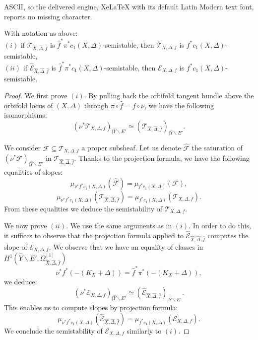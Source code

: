 \documentclass[10pt,a4paper]{amsart}
\begin{document}
ASCII, so the delivered engine, XeLaTeX with its default Latin Modern text font, reports no missing character.
\begin{lemm}\label{Reduction of semistability to the resolution}
    With notation as above:\\
    $(i)$ if $\mathcal{T}_{\widehat{X}, \widehat{\Delta}, \widehat{f}}$ is $\widehat{f}^*\pi^*c_1(X, \Delta)$-semistable, then $\mathcal{T}_{X, \Delta, f}$ is $f^*c_1(X, \Delta)$-semistable,\\
    $(ii)$ if $\widehat{\mathcal{E}}_{\widehat{X}, \widehat{\Delta}, \widehat{f}}$ is $\widehat{f}^*\pi^*c_1(X, \Delta)$-semistable, then $\mathcal{E}_{X, \Delta, f}$ is $f^*c_1(X, \Delta)$-semistable.
\end{lemm}

\begin{proof}

We first prove $(i)$. By pulling back the orbifold tangent bundle above the orbifold locus of $(X, \Delta)$ through $\pi \circ \widehat{f} = f \circ \nu $, we have the following isomorphisms:
$$
(\nu^{*}\mathcal{T}_{X, \Delta, f})_{|\widehat{Y} \backslash E'} \simeq (\mathcal{T}_{\widehat{X}, \widehat{\Delta}, \widehat{f}})_{|\widehat{Y} \backslash E'}.
$$

We consider $\mathcal{F} \subseteq \mathcal{T}_{X, \Delta, f}$ a proper subsheaf. Let us denote $\widehat{\mathcal{F}}$ the saturation of $(\nu^*\mathcal{F})_{|\widehat{Y} \backslash E'}$ in $\mathcal{T}_{\widehat{X}, \widehat{\Delta}, \widehat{f}}$. Thanks to the projection formula, we have the following equalities of slopes:
$$
\mu_{\nu^*f^*c_1(X, \Delta)}(\widehat{\mathcal{F}}) = \mu_{f^*c_1(X, \Delta)}(\mathcal{F}),
$$
$$
\mu_{\nu^*f^*c_1(X, \Delta)}(\mathcal{T}_{\widehat{X}, \widehat{\Delta}, \widehat{f}}) = \mu_{f^*c_1(X, \Delta)}(\mathcal{T}_{X, \Delta, f}).
$$
From these equalities we deduce the semistability of $\mathcal{T}_{X, \Delta, f}$.

We now prove $(ii)$. We use the same arguments as in $(i)$. In order to do this, it suffices to observe that the projection formula applied to $\widehat{\mathcal{E}}_{\widehat{X}, \widehat{\Delta}, \widehat{f}}$ computes the slope of $\mathcal{E}_{X, \Delta, f}$. We observe that we have an equality of classes in $H^1(\widehat{Y} \backslash E', \Omega^{[1]}_{\widehat{X}, \widehat{\Delta}, \widehat{f}})$
$$
\nu^*f^*(-(K_X + \Delta)) = \widehat{f}^*\pi^*(-(K_X + \Delta)),
$$
we deduce:
$$
\left(\nu^{*}\mathcal{E}_{X, \Delta, f}\right)_{|\widehat{Y} \backslash E'} \simeq (\widehat{\mathcal{E}}_{\widehat{X}, \widehat{\Delta}, \widehat{f}})_{|\widehat{Y} \backslash E'}.
$$
This enables us to compute slopes by projection formula:
$$
\mu_{\nu^*f^*c_1(X, \Delta)}(\widehat{\mathcal{E}}_{\widehat{X}, \widehat{\Delta}, \widehat{f}}) = \mu_{f^*c_1(X, \Delta)}(\mathcal{E}_{X, \Delta, f}).
$$
We conclude the semistability of $\mathcal{E}_{X, \Delta, f}$ similarly to $(i)$.
\end{proof}
\end{document}
